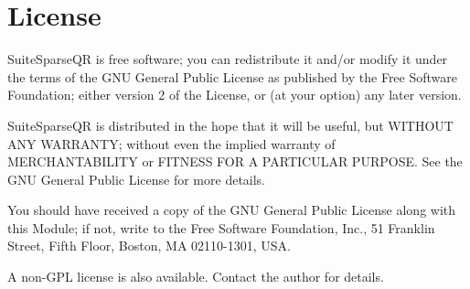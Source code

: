 \documentclass[12pt]{article}
\begin{document}
\section{License}

SuiteSparseQR is free software; you can redistribute it and/or modify it under
the terms of the GNU General Public License as published by the Free Software
Foundation; either version 2 of the License, or (at your option) any later
version.

SuiteSparseQR is distributed in the hope that it will be useful, but WITHOUT
ANY WARRANTY; without even the implied warranty of MERCHANTABILITY or FITNESS
FOR A PARTICULAR PURPOSE.  See the GNU General Public License for more details.

You should have received a copy of the GNU General Public License along with
this Module; if not, write to the Free Software Foundation, Inc., 51 Franklin
Street, Fifth Floor, Boston, MA  02110-1301, USA.

A non-GPL license is also available.  Contact the author for details.
\end{document}

